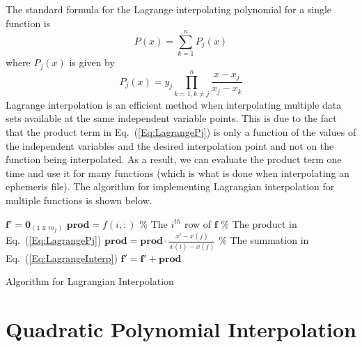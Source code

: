 The standard formula for the Lagrange interpolating polynomial for a
single function is
%
\begin{equation}
    P(x) =  \sum_{k=1}^n P_j(x) \label{Eq:LagrangeInterp}
\end{equation}
%
where $P_j(x)$ is given by
%
\begin{equation}
   P_j(x) = y_j\prod_{k=1,k \neq j}^n\frac{x - x_j}{x_j - x_k} \label{Eq:LagrangePj}
\end{equation}
%
Lagrange interpolation is an efficient method when interpolating
multiple data sets available at the same independent variable
points.  This is due to the fact that the product term in
Eq.~(\ref{Eq:LagrangePj}) is only a function of the values of the
independent variables and the desired interpolation point and not on
the function being interpolated.  As a result, we can evaluate the
product term one time and use it for many functions (which is what
is done when interpolating an ephemeris file).  The algorithm for
implementing Lagrangian interpolation for multiple functions is
shown below.

\begin{center}
\begin{minipage}{6 in}
\begin{small}
\begin{algorithm}[H]

    \SetLine {}
    $\mathbf{f}' = \mathbf{0}_{(1 \mbox{ x } m_f)}$\;
    {
        $\mathbf{prod} = f(i,:)$ \% The $i^{th}$ row of $\mathbf{f}$ \;
        {
            {
            \% The product in Eq.~(\ref{Eq:LagrangePj})\;
                    $ \mathbf{prod} = \mathbf{prod} \cdot \displaystyle\frac{x' - x(j)}{x(i) - x(j)}$\;
            }
        }
       \% The summation in Eq.~(\ref{Eq:LagrangeInterp})\;
       $ \mathbf{f}'= \mathbf{f}' + \mathbf{prod}$\;
    }
    \hspace{.2 in}
    \label{alg:LagrangeInterpolation}\caption{Algorithm for Lagrangian Interpolation}
\end{algorithm}
\end{small}
\end{minipage}
\end{center}


\section{Quadratic Polynomial Interpolation }


